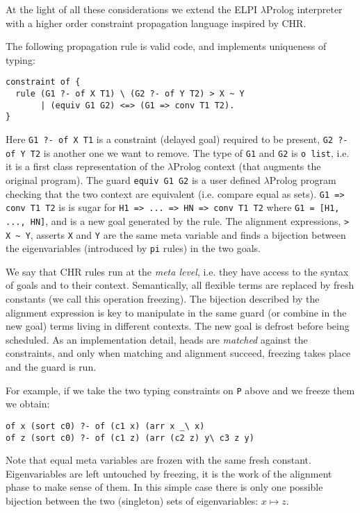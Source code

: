 \documentclass{easychair}
\begin{document}
At the light of all these considerations we extend the ELPI
$\lambda$Prolog interpreter with a higher order constraint propagation
language inspired by CHR.

The following propagation rule is valid code, and implements
uniqueness of typing:

\begin{Verbatim}
constraint of {
  rule (G1 ?- of X T1) \ (G2 ?- of Y T2) > X ~ Y
       | (equiv G1 G2) <=> (G1 => conv T1 T2).
}
\end{Verbatim}

Here \verb+G1 ?- of X T1+ is a constraint (delayed goal) required
to be present, \verb+G2 ?- of Y T2+ is another one we want to remove.
The type of \verb+G1+ and \verb+G2+ is \verb+o list+, i.e.
it is a first class representation of the $\lambda$Prolog context
(that augments the original program).  
The guard \verb+equiv G1 G2+ is a user defined $\lambda$Prolog program
checking that the two context are equivalent (i.e.
compare equal as sets).  \verb+G1 => conv T1 T2+ is
is sugar for \verb+H1 => ... => HN => conv T1 T2+ where
\verb+G1 = [H1, ..., HN]+, and is a new goal generated by the rule.
The alignment expressions, \verb+> X ~ Y+, asserts \verb+X+ and \verb+Y+
are the same meta variable and finds a bijection between the
eigenvariables (introduced by \verb+pi+ rules) in the two goals.

We say that CHR rules run at the \emph{meta level}, i.e. they have access
to the syntax of goals and to their context.  Semantically, all flexible
terms are replaced by fresh constants (we call this operation freezing).
The bijection described by the alignment expression is key to
manipulate in the same guard (or combine in the new goal) terms
living in different contexts.  The new goal is defrost before being
scheduled.
As an implementation detail, heads are \emph{matched} against the
constraints, and only when matching and alignment succeed, freezing
takes place and the guard is run.

For example, if we take the two typing constraints on \verb+P+ above
and we freeze them we obtain:

\begin{Verbatim}
of x (sort c0) ?- of (c1 x) (arr x _\ x)
of z (sort c0) ?- of (c1 z) (arr (c2 z) y\ c3 z y)
\end{Verbatim}

Note that equal meta variables are frozen with the same fresh
constant.  Eigenvariables are left untouched by freezing, it is
the work of the alignment phase to make sense of them.
In this simple case there is only one possible bijection
between the two (singleton) sets of eigenvariables: 
$x \mapsto z$.
\end{document}
